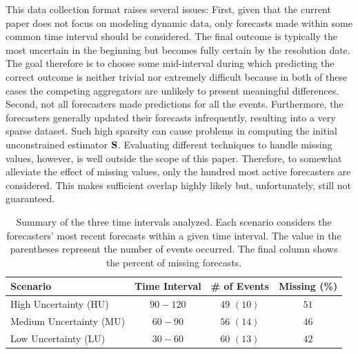 \documentclass[11pt]{article}
\theoremstyle{definition}
\theoremstyle{definition}
\def\SS{{\bf S}}
\begin{document}

This data collection format raises several issues: First, given that the current paper does not focus on modeling dynamic data, only forecasts made within some common time interval should be considered.  The final outcome is typically the most uncertain in the beginning but becomes fully certain by the resolution date. The goal therefore is to choose some mid-interval during which predicting the correct outcome is neither trivial nor extremely difficult because in both of these cases the competing aggregators are unlikely to present meaningful differences. Second, not all forecasters made predictions for all the events. Furthermore, the forecasters generally updated their forecasts infrequently, resulting into a very sparse dataset. Such high sparsity can cause problems in  computing the initial unconstrained estimator $\SS$. 
Evaluating different techniques to handle missing values, however, is well outside the scope of this paper. Therefore, to somewhat alleviate the effect of missing values, only the hundred most active forecasters are considered. This makes sufficient overlap highly likely but, unfortunately, still not guaranteed. 


\begin{table}[t!]
   \centering
   \begin{tabular}{l ccc } %
      Scenario      & Time Interval & \# of Events & Missing (\%)  \\\hline
      High Uncertainty (HU)        & $90-120$     & $49$ $(10)$ & $51$\\ 
      Medium Uncertainty (MU)       & $60-90$  &  $56$ $(14)$  & $46$ \\
      Low Uncertainty (LU) &  $30-60$ & $60$ $(13)$ & $42$\\
   \end{tabular}
   \caption{Summary of the three time intervals analyzed. Each scenario considers the forecasters' most recent forecasts within a given time interval. The value in the parentheses represent the number of events occurred. The final column shows the percent of missing forecasts. }
   \label{scenarios}
\end{table}
\end{document}
